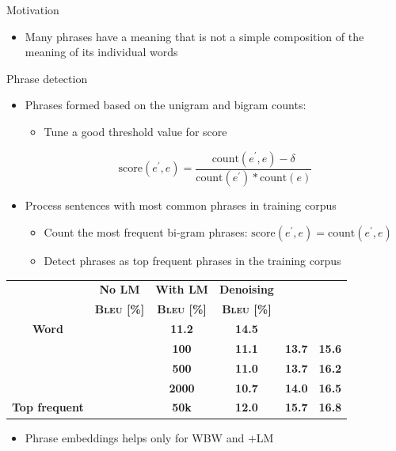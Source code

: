 \documentclass[11pt, a4paper, landscape]{article}
\begin{document}
\NewPage
{}
Motivation
\begin{itemize}
	\item Many phrases have a meaning that is not a simple composition of the meaning of its individual words\\
\end{itemize}
Phrase detection
\begin{itemize}
	\item Phrases formed based on the unigram and bigram counts:\\
	\cite{mikolov2013distributed} 
	\begin{itemize}
		\item Tune a good threshold value for score
	\end{itemize}
	\[ \textrm{score}(e^\prime, e) = \frac{\textrm{count}(e^\prime, e) - \delta}{\textrm{count}(e^\prime)*\textrm{count}(e)} \]	
	\item Process sentences with most common phrases in training corpus
	\begin{itemize}
		\item Count the most frequent bi-gram phrases: ${\textrm{score}(e^\prime, e) = \textrm{count}(e^\prime, e)}$
		\item Detect phrases as top frequent phrases in the training corpus
	\end{itemize}
	
\end{itemize}	
\NewPage
{}
\vfill
\begin{table}[]
	\centering
	\begin{tabular}{>{\bfseries}c>{\bfseries}c>{\bfseries}c>{\bfseries}c>{\bfseries}c  >{\bfseries}c}
		\hline
		\multicolumn{3}{c}{\multirow{2}{*}{\textbf{Vocabulary}}}                  & No LM & With LM & Denoising \\
		\multicolumn{3}{c}{}                                         &  \textsc{Bleu} [\%]  &  \textsc{Bleu} [\%] & \textsc{Bleu} [\%]   \\ \hline
		Word            & \multicolumn{2}{l}{}              & 11.2 & 14.5  &\leavevmode\color{blue}{ 17.2} \\
		 \hline
		\multirow{3}{*}{\cite{mikolov2013distributed} } & \multirow{3}{*}{threshold} & 100  & 11.1 & 13.7  & 15.6 \\ \cline{3-6} 
		&                            & 500  & 11.0 & 13.7  & 16.2 \\ \cline{3-6} 
		&                            & 2000 & 10.7 & 14.0  &16.5 \\ \hline
		Top frequent              & \multicolumn{1}{l}{\textbf{count}}  & 50k  & \leavevmode\color{blue}12.0 & \leavevmode\color{blue}15.7  & 16.8 \\ \hline
	\end{tabular}
\end{table}
\begin{itemize}
	\item Phrase embeddings helps only for WBW and  $+$LM
\end{itemize}
\vfill
\end{document}
